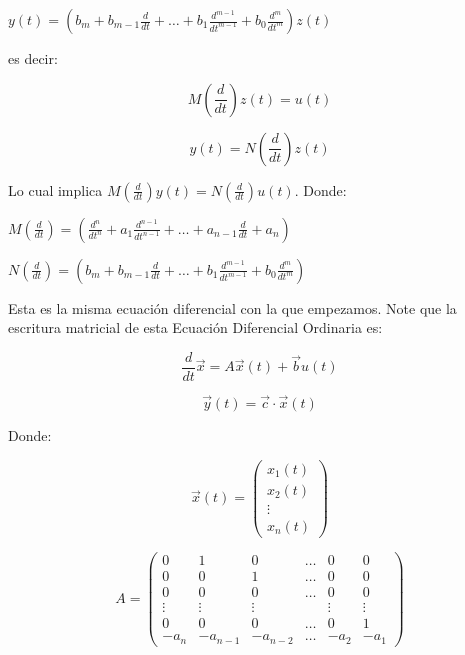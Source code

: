 \begin{math}
y(t) = \left( b_m + b_{m-1} \frac{d}{dt} + \dots + b_1 \frac{d^{m-1}}{dt^{m-1}} + b_0 \frac{d^m}{dt^m} \right) z(t)
\end{math}

es decir:

\begin{equation}
M \left( \frac{d}{dt} \right) z(t) = u(t)
\end{equation}

\begin{equation}
y(t) = N \left( \frac{d}{dt} \right) z(t)
\end{equation}

Lo cual implica $M \left( \frac{d}{dt} \right) y(t) = N \left( \frac{d}{dt} \right) u(t)$. Donde:

\begin{math}
M \left( \frac{d}{dt} \right) = \left( \frac{d^n}{dt^n} + a_1 \frac{d^{n-1}}{dt^{n-1}} + \dots + a_{n-1} \frac{d}{dt} + a_n \right)
\end{math}

\begin{math}
N \left( \frac{d}{dt} \right) = \left( b_m + b_{m-1} \frac{d}{dt} + \dots + b_1 \frac{d^{m-1}}{dt^{m-1}} + b_0 \frac{d^m}{dt^m} \right)
\end{math}

Esta es la misma ecuación diferencial con la que empezamos. Note que la escritura matricial de esta Ecuación Diferencial Ordinaria es:

\begin{equation}
\frac{d}{dt} \vec{x} = A \vec{x}(t) + \vec{b} u(t)
\end{equation}

\begin{equation}
\vec{y}(t) = \vec{c} \cdot \vec{x}(t)
\end{equation}

Donde:

\begin{equation}
\vec{x}(t) =
\begin{pmatrix}
x_1(t) \\
x_2(t) \\
\vdots \\
x_n(t)
\end{pmatrix}
\end{equation}

\begin{equation}
A =
\begin{pmatrix}
0 & 1 & 0 & \dots & 0 & 0 \\
0 & 0 & 1 & \dots & 0 & 0 \\
0 & 0 & 0 & \dots & 0 & 0 \\
\vdots & \vdots & \vdots &   & \vdots & \vdots \\
0 & 0 & 0 & \dots & 0 & 1 \\
-a_n & -a_{n-1} & -a_{n-2} & \dots & -a_2 & -a_1
\end{pmatrix}
\end{equation}


